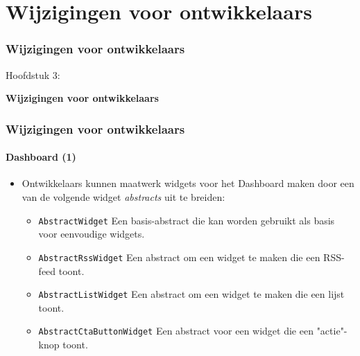 %

\section{Wijzigingen voor ontwikkelaars}
\begin{frame}[fragile]
	\frametitle{Wijzigingen voor ontwikkelaars}

	\begin{center}\huge{Hoofdstuk 3:}\end{center}
	\begin{center}\huge{\color{typo3darkgrey}\textbf{Wijzigingen voor ontwikkelaars}}\end{center}

\end{frame}


\begin{frame}[fragile]
	\frametitle{Wijzigingen voor ontwikkelaars}
	\framesubtitle{Dashboard (1)}

	\lstset{basicstyle=\smaller\ttfamily}

	\begin{itemize}
		\item Ontwikkelaars kunnen maatwerk widgets voor het Dashboard maken door een van de volgende widget \textit{abstracts} uit te breiden:

			\begin{itemize}
				\item \texttt{AbstractWidget}\newline
					\small
						Een basis-abstract die kan worden gebruikt als basis voor eenvoudige widgets.
					\normalsize
				\item \texttt{AbstractRssWidget}\newline
					\small
						Een abstract om een widget te maken die een RSS-feed toont.
					\normalsize
				\item \texttt{AbstractListWidget}\newline
					\small
						Een abstract om een widget te maken die een lijst toont.
					\normalsize
				\item \texttt{AbstractCtaButtonWidget}\newline
					\small
						Een abstract voor een widget die een "actie"-knop toont.
					\normalsize
			\end{itemize}

	\end{itemize}

\end{frame}

